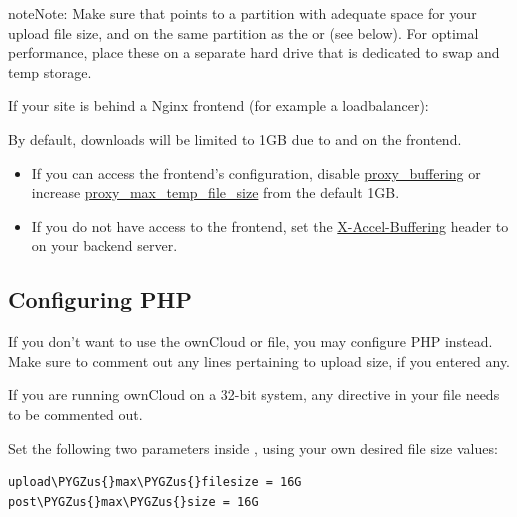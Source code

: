 \documentclass[letterpaper,10pt,english]{sphinxmanual}
\def\PYGZus{\char`\_}
\begin{document}
\begin{notice}{note}{Note:}
Make sure that  points to a partition with
adequate space for your upload file size, and on the same partition as
the  or  (see below). For optimal
performance, place these on a separate hard drive that is dedicated to
swap and temp storage.
\end{notice}

If your site is behind a Nginx frontend (for example a loadbalancer):

By default, downloads will be limited to 1GB due to  and  on the frontend.
\begin{itemize}
\item {} 
If you can access the frontend's configuration, disable \href{http://nginx.org/en/docs/http/ngx\_http\_proxy\_module.html\#proxy\_buffering}{proxy\_buffering} or increase \href{http://nginx.org/en/docs/http/ngx\_http\_proxy\_module.html\#proxy\_max\_temp\_file\_size}{proxy\_max\_temp\_file\_size} from the default 1GB.

\item {} 
If you do not have access to the frontend, set the \href{http://nginx.org/en/docs/http/ngx\_http\_proxy\_module.html\#proxy\_buffering}{X-Accel-Buffering} header to  on your backend server.

\end{itemize}


\subsection{Configuring PHP}
\label{configuration_files/big_file_upload_configuration:configuring-php}
If you don't want to use the ownCloud  or  file, you may
configure PHP instead. Make sure to comment out any lines 
pertaining to upload size, if you entered any.

If you are running ownCloud on a 32-bit system, any  directive
in your  file needs to be commented out.

Set the following two parameters inside , using your own desired
file size values:

\begin{Verbatim}[commandchars=\\\{\}]
upload\PYGZus{}max\PYGZus{}filesize = 16G
post\PYGZus{}max\PYGZus{}size = 16G
\end{Verbatim}
\end{document}
